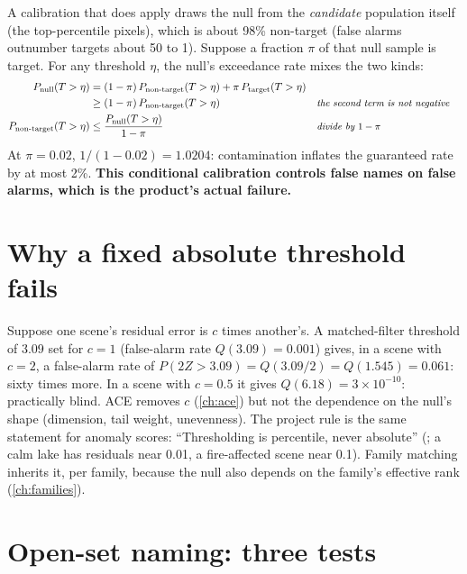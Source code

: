\documentclass[11pt,a4paper,oneside,openany]{book}
\newcommand{\why}[1]{&&\text{\small\itshape #1}}
\begin{document}
A calibration that does apply draws the null from the \emph{candidate} population itself (the top-percentile pixels), which is about 98\% non-target (false alarms
outnumber targets about 50 to 1). Suppose a fraction $\pi$ of that null sample is target. For any threshold $\eta$, the null's exceedance rate mixes the two kinds:
\begin{align*}
P_{\rm null}(T>\eta) &= (1-\pi)\,P_{\rm non\text{-}target}(T>\eta)+\pi\,P_{\rm target}(T>\eta)\\
 &\ge(1-\pi)\,P_{\rm non\text{-}target}(T>\eta) \why{the second term is not negative}\\
P_{\rm non\text{-}target}(T>\eta) &\le\frac{P_{\rm null}(T>\eta)}{1-\pi} \why{divide by $1-\pi$}
\end{align*}
At $\pi=0.02$, $1/(1-0.02)=1.0204$: contamination inflates the guaranteed rate by at most 2\%. \textbf{This conditional calibration controls false names on false alarms,
which is the product's actual failure.}

\section{Why a fixed absolute threshold fails}

Suppose one scene's residual error is $c$ times another's. A matched-filter threshold of $3.09$ set for $c=1$ (false-alarm rate $Q(3.09)=0.001$) gives, in a scene with
$c=2$, a false-alarm rate of $P(2Z>3.09)=Q(3.09/2)=Q(1.545)=0.061$: sixty times more. In a scene with $c=0.5$ it gives $Q(6.18)=3\times10^{-10}$: practically blind.
ACE removes $c$ (\cref{ch:ace}) but not the dependence on the null's shape (dimension, tail weight, unevenness). The project rule is the same statement for anomaly scores:
``Thresholding is percentile, never absolute'' (; a calm lake has residuals near 0.01, a fire-affected scene near 0.1). Family matching
inherits it, per family, because the null also depends on the family's effective rank (\cref{ch:families}).

\section{Open-set naming: three tests}
\end{document}
